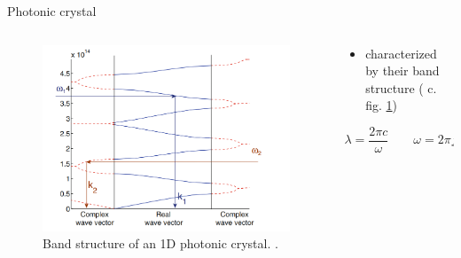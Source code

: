 \begin{frame}{Photonic crystal}

  \begin{columns}

    \begin{column}{0.49\textwidth}
      \begin{figure}
        \centering
        \includegraphics[width=1\textwidth]{./bilder/band_structure.png}
        \caption{Band structure of an 1D photonic crystal. \cite{intro_pho}.}
        \label{fig: band_structure}
      \end{figure}
    \end{column}

    \begin{column}{0.49\textwidth}
    \begin{itemize}
      \setlength\itemsep{1.2em}
      \item{characterized by their band structure ( c. fig. \ref{fig: band_structure}) }
    \end{itemize}
    \begin{equation*}
      \lambda=\frac{2\pi c}{\omega}\qquad \omega =2\pi f
    \end{equation*}
    \end{column}

  \end{columns}

\end{frame}

